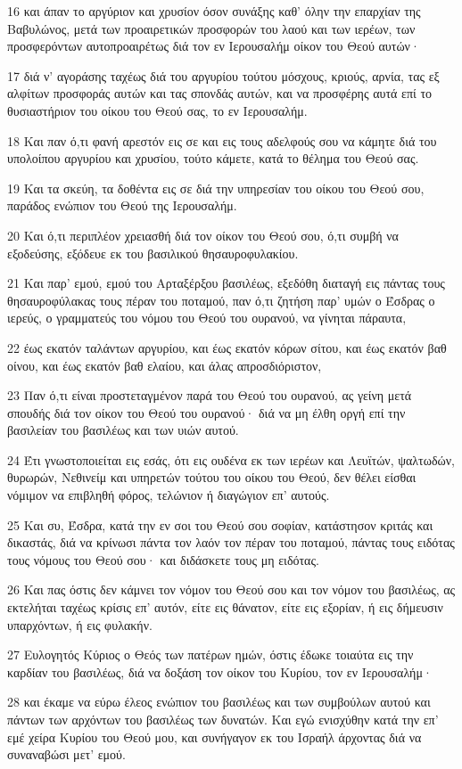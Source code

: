 \par 16 και άπαν το αργύριον και χρυσίον όσον συνάξης καθ' όλην την επαρχίαν της Βαβυλώνος, μετά των προαιρετικών προσφορών του λαού και των ιερέων, των προσφερόντων αυτοπροαιρέτως διά τον εν Ιερουσαλήμ οίκον του Θεού αυτών·
\par 17 διά ν' αγοράσης ταχέως διά του αργυρίου τούτου μόσχους, κριούς, αρνία, τας εξ αλφίτων προσφοράς αυτών και τας σπονδάς αυτών, και να προσφέρης αυτά επί το θυσιαστήριον του οίκου του Θεού σας, το εν Ιερουσαλήμ.
\par 18 Και παν ό,τι φανή αρεστόν εις σε και εις τους αδελφούς σου να κάμητε διά του υπολοίπου αργυρίου και χρυσίου, τούτο κάμετε, κατά το θέλημα του Θεού σας.
\par 19 Και τα σκεύη, τα δοθέντα εις σε διά την υπηρεσίαν του οίκου του Θεού σου, παράδος ενώπιον του Θεού της Ιερουσαλήμ.
\par 20 Και ό,τι περιπλέον χρειασθή διά τον οίκον του Θεού σου, ό,τι συμβή να εξοδεύσης, εξόδευε εκ του βασιλικού θησαυροφυλακίου.
\par 21 Και παρ' εμού, εμού του Αρταξέρξου βασιλέως, εξεδόθη διαταγή εις πάντας τους θησαυροφύλακας τους πέραν του ποταμού, παν ό,τι ζητήση παρ' υμών ο Έσδρας ο ιερεύς, ο γραμματεύς του νόμου του Θεού του ουρανού, να γίνηται πάραυτα,
\par 22 έως εκατόν ταλάντων αργυρίου, και έως εκατόν κόρων σίτου, και έως εκατόν βαθ οίνου, και έως εκατόν βαθ ελαίου, και άλας απροσδιόριστον,
\par 23 Παν ό,τι είναι προστεταγμένον παρά του Θεού του ουρανού, ας γείνη μετά σπουδής διά τον οίκον του Θεού του ουρανού· διά να μη έλθη οργή επί την βασιλείαν του βασιλέως και των υιών αυτού.
\par 24 Έτι γνωστοποιείται εις εσάς, ότι εις ουδένα εκ των ιερέων και Λευϊτών, ψαλτωδών, θυρωρών, Νεθινείμ και υπηρετών τούτου του οίκου του Θεού, δεν θέλει είσθαι νόμιμον να επιβληθή φόρος, τελώνιον ή διαγώγιον επ' αυτούς.
\par 25 Και συ, Έσδρα, κατά την εν σοι του Θεού σου σοφίαν, κατάστησον κριτάς και δικαστάς, διά να κρίνωσι πάντα τον λαόν τον πέραν του ποταμού, πάντας τους ειδότας τους νόμους του Θεού σου· και διδάσκετε τους μη ειδότας.
\par 26 Και πας όστις δεν κάμνει τον νόμον του Θεού σου και τον νόμον του βασιλέως, ας εκτελήται ταχέως κρίσις επ' αυτόν, είτε εις θάνατον, είτε εις εξορίαν, ή εις δήμευσιν υπαρχόντων, ή εις φυλακήν.
\par 27 Ευλογητός Κύριος ο Θεός των πατέρων ημών, όστις έδωκε τοιαύτα εις την καρδίαν του βασιλέως, διά να δοξάση τον οίκον του Κυρίου, τον εν Ιερουσαλήμ·
\par 28 και έκαμε να εύρω έλεος ενώπιον του βασιλέως και των συμβούλων αυτού και πάντων των αρχόντων του βασιλέως των δυνατών. Και εγώ ενισχύθην κατά την επ' εμέ χείρα Κυρίου του Θεού μου, και συνήγαγον εκ του Ισραήλ άρχοντας διά να συναναβώσι μετ' εμού.

